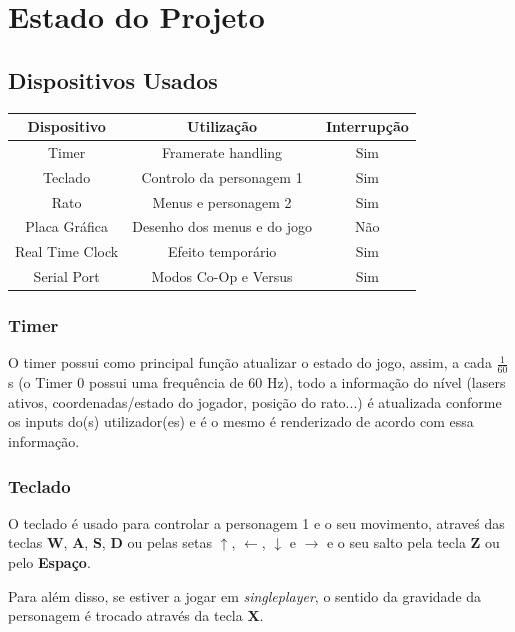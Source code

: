 \documentclass{report}
\begin{document}
\chapter{Estado do Projeto}

\section{Dispositivos Usados}

\begin{center}
	\begin{tabular}{|c|c|c|} 
		\hline
			Dispositivo & Utilização & Interrupção \\ 
		\hline
		\hline
			Timer & Framerate handling  & Sim \\ 
			Teclado & Controlo da personagem 1 & Sim \\ 
			Rato & Menus e personagem 2 & Sim\\
			Placa Gráfica & Desenho dos menus e do jogo & Não\\
			Real Time Clock & Efeito temporário & Sim\\
			Serial Port & Modos Co-Op e Versus & Sim \\
		\hline
	\end{tabular}
\end{center}

\subsection{Timer}

O timer possui como principal função atualizar o estado do jogo, assim, a cada $\frac{1}{60}$s (o Timer 0 possui uma frequência de 60 Hz), todo a informação do nível (lasers ativos, coordenadas/estado do jogador, posição do rato...) é atualizada conforme os inputs do(s) utilizador(es) e é o mesmo é renderizado de acordo com essa informação.

\subsection{Teclado}

O teclado é usado para controlar a personagem 1 e o seu movimento, atraveś das teclas \textbf{W}, \textbf{A}, \textbf{S}, \textbf{D} ou pelas setas $\uparrow$, $\leftarrow$, $\downarrow$ e $\rightarrow$ e o seu salto pela tecla \textbf{Z} ou pelo \textbf{Espaço}.

Para além disso, se estiver a jogar em \textit{singleplayer}, o sentido da gravidade da personagem é trocado através da tecla \textbf{X}.
\end{document}
